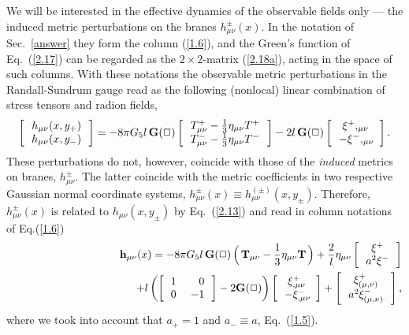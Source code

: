 \documentclass[a4paper,preprint,nofootinbib,
                 showpacs,preprintnumbers,amsmath,amssymb]{revtex4}
\begin{document}
We will be interested in the effective dynamics of the 
observable fields only --- the induced metric perturbations on the 
branes $h_{\mu\nu}^\pm(x)$. In the notation of Sec.~\ref{answer} 
they form the column (\ref{1.6}), and the Green's function of 
Eq.~(\ref{2.17}) can be regarded as the $2\times2$-matrix 
(\ref{2.18a}), acting in the space of such columns. With these 
notations the observable metric perturbations in the 
Randall-Sundrum gauge read as the following (nonlocal) linear 
combination of stress tensors and radion fields, 
    \begin{equation} 
    \left[\begin{array}{c} 
    \,h_{\mu\nu}(x,y_+)\, \\ \, h_{\mu\nu}(x,y_-)\, 
    \end{array}\right]= 
    - 8 \pi G_5 l\,{\bf G}(\Box) 
    \left[\begin{array}{c} 
    \,T^+_{\mu \nu} - \frac{1}{3} \eta_{\mu \nu} T^+\, \\ 
      \,T^-_{\mu \nu} - \frac{1}{3} \eta_{\mu \nu} T^-\, 
     \end{array}\right] 
   - 2l\,{\bf G}(\Box) \left[\begin{array}{c} 
       \,\xi^+,_{\mu \nu}\, \\ 
                 \, - \xi^-,_{\mu \nu} 
      \end{array}\right].                    \label{2.21} 
    \end{equation} 
These perturbations do not, however, coincide with those of the 
{\em induced} metrics on branes, $h_{\mu\nu}^\pm$. The latter 
coincide with the metric coefficients in two respective Gaussian 
normal coordinate systems, $h_{\mu\nu}^\pm(x)\equiv 
h^{(\pm)}_{\mu\nu}(x,y_\pm)$. Therefore, $h_{\mu\nu}^\pm(x)$ is 
related to $h_{\mu\nu}(x,y_\pm)$ by Eq.~(\ref{2.13}) and read in 
column notations of Eq.(\ref{1.6}) 
    \begin{eqnarray} 
    &&{\bf h}_{\mu\nu}(x)= 
  - 8 \pi G_5 l\,{\bf G}(\Box)\, 
      \Big(\,{\bf T}_{\mu \nu} 
      - \frac{1}{3} \eta_{\mu \nu} {\bf T}\,\Big) 
   +\frac2l\eta_{\mu\nu}\left[\begin{array}{c} 
      \,\xi^+\, \\ \, a^2\xi^-\, \end{array}\right]\nonumber\\ 
    &&\qquad\qquad\qquad\qquad\qquad\quad 
    +l\left(\left[\begin{array}{cr} 
      \,1\,&\,0\, \\ \,0\,&\,-1\, \end{array}\right] 
    - 2{\bf G}(\Box)\right) \left[\begin{array}{c} 
       \,\xi^+_{,\mu \nu}\,\\ 
       \,- \xi^-_{,\mu \nu}\end{array}\right] 
   +\left[\begin{array}{c} 
      \,\xi^+_{(\mu,\nu)}\, 
      \\ \, a^2\xi^-_{(\mu,\nu)}\, \end{array}\right], \label{2.22} 
    \end{eqnarray} 
where we took into account that $a_+=1$ and $a_-\equiv a$, 
Eq.~(\ref{1.5}). 
 
\end{document}
